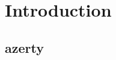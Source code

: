 \documentclass[../main.tex]{subfiles}
\begin{document}
\chapter{Introduction}

\section{azerty}

\lipsum[1]
\end{document}
